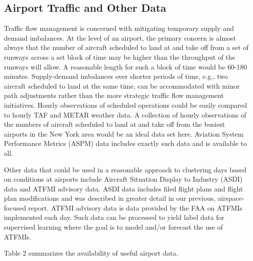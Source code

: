 \documentclass[11pt]{scrartcl}
\begin{document}
\subsection{Airport Traffic and Other Data}
Traffic flow management is concerned with mitigating temporary supply and demand imbalances. At the level of an airport, the primary concern is almost always that the number of aircraft scheduled to land at and take off from a set of runways across a set block of time may be higher than the throughput of the runways will allow. A reasonable length for such a block of time would be 60-180 minutes. Supply-demand imbalances over shorter periods of time, e.g., two aircraft scheduled to land at the same time, can be accommodated with minor path adjustments rather than the more strategic traffic flow management initiatives. Hourly observations of scheduled operations could be easily compared to hourly TAF and METAR weather data. A collection of hourly observations of the numbers of aircraft scheduled to land at and take off from the busiest airports in the New York area would be an ideal data set here.  Aviation System Performance Metrics (ASPM) data includes exactly such data and is available to all.

Other data that could be used in a reasonable approach to clustering days based on conditions at airports include Aircraft Situation Display to Industry (ASDI) data and ATFMI advisory data.  ASDI data includes filed flight plans and flight plan modifications and was described in greater detail in our previous, airspace-focused report.  ATFMI advisory data is data provided by the FAA on ATFMIs implemented each day.  Such data can be processed to yield label data for supervised learning where the goal is to model and/or forecast the use of ATFMIs.

Table 2 summarizes the availability of useful airport data.
\end{document}
